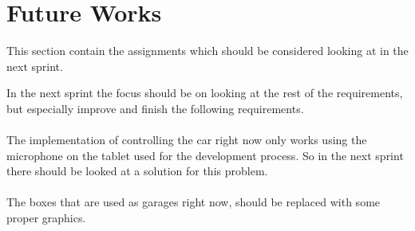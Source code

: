 \section{Future Works}
This section contain the assignments which should be considered looking at in the next sprint.

In the next sprint the focus should be on looking at the rest of the requirements, but especially improve and finish the following requirements.

\paragraph{}
The implementation of controlling the car right now only works using the microphone on the tablet used for the development process.
So in the next sprint there should be looked at a solution for this problem.
\paragraph{}
The boxes that are used as garages right now, should be replaced with some proper graphics.
